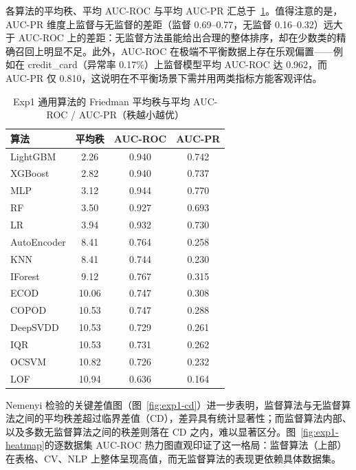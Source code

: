 各算法的平均秩、平均 AUC-ROC 与平均 AUC-PR 汇总于~\ref{tab:exp1-friedman}。值得注意的是，AUC-PR 维度上监督与无监督的差距（监督 0.69--0.77，无监督 0.16--0.32）远大于 AUC-ROC 上的差距：无监督方法虽能给出合理的整体排序，却在少数类的精确召回上明显不足。此外，AUC-ROC 在极端不平衡数据上存在乐观偏置——例如在 credit\_card（异常率 0.17\%）上监督模型平均 AUC-ROC 达 0.962，而 AUC-PR 仅 0.810，这说明在不平衡场景下需并用两类指标方能客观评估。

\begin{table}[!t]
  \caption{Exp1 通用算法的 Friedman 平均秩与平均 AUC-ROC / AUC-PR（秩越小越优）}\label{tab:exp1-friedman}
  \centering
  \small
  \begin{tabular*}{\linewidth}{@{\extracolsep{\fill}}lccc@{}}
    \toprule
    \textbf{算法} & \textbf{平均秩} & \textbf{AUC-ROC} & \textbf{AUC-PR} \\
    \midrule
    LightGBM    & 2.26  & 0.940 & 0.742 \\
    XGBoost     & 2.82  & 0.940 & 0.737 \\
    MLP         & 3.12  & 0.944 & 0.770 \\
    RF          & 3.50  & 0.927 & 0.693 \\
    LR          & 3.94  & 0.932 & 0.730 \\
    \midrule
    AutoEncoder & 8.41  & 0.764 & 0.258 \\
    KNN         & 8.41  & 0.744 & 0.230 \\
    IForest     & 9.12  & 0.767 & 0.315 \\
    ECOD        & 10.06 & 0.747 & 0.308 \\
    COPOD       & 10.53 & 0.747 & 0.288 \\
    DeepSVDD    & 10.53 & 0.729 & 0.261 \\
    IQR         & 10.53 & 0.731 & 0.262 \\
    OCSVM       & 10.82 & 0.726 & 0.232 \\
    LOF         & 10.94 & 0.636 & 0.164 \\
    \bottomrule
  \end{tabular*}
\end{table}

Nemenyi 检验的关键差值图（图~\ref{fig:exp1-cd}）进一步表明，监督算法与无监督算法之间的平均秩差超过临界差值（CD），差异具有统计显著性；而监督算法内部、以及多数无监督算法之间的秩差则落在 CD 之内，难以显著区分。图~\ref{fig:exp1-heatmap}的逐数据集 AUC-ROC 热力图直观印证了这一格局：监督算法（上部）在表格、CV、NLP 上整体呈现高值，而无监督算法的表现更依赖具体数据集。

